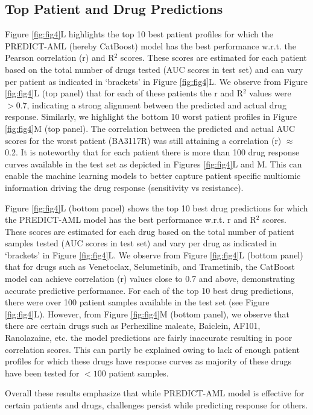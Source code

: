\documentclass[pdflatex,sn-mathphys-num]{sn-jnl}%
\theoremstyle{thmstyleone}%
\theoremstyle{thmstyletwo}%
\theoremstyle{thmstylethree}%
\begin{document}
\subsection{Top Patient and Drug Predictions}
Figure \ref{fig:fig4}L highlights the top 10 best patient profiles for which the PREDICT-AML (hereby CatBoost) model has the best performance w.r.t. the Pearson correlation (r) and R$^2$ scores. These scores are estimated for each patient based on the total number of drugs tested (AUC scores in test set) and can vary per patient as indicated in `brackets' in Figure \ref{fig:fig4}L. We observe from Figure \ref{fig:fig4}L (top panel) that for each of these patients the r and R$^2$ values were $> 0.7$, indicating a strong alignment between the predicted and actual drug response. Similarly, we highlight the bottom 10 worst patient profiles in Figure \ref{fig:fig4}M (top panel). The correlation between the predicted and actual AUC scores for the worst patient (BA3117R) was still attaining a correlation (r) $\approx$ 0.2. It is noteworthy that for each patient there is more than 100 drug response curves available in the test set as depicted in Figures \ref{fig:fig4}L and M. This can enable the machine learning models to better capture patient specific multiomic information driving the drug response (sensitivity vs resistance).

Figure \ref{fig:fig4}L (bottom panel) shows the top 10 best drug predictions for which the PREDICT-AML model has the best performance w.r.t. r and R$^2$ scores. These scores are estimated for each drug based on the total number of patient samples tested (AUC scores in test set) and vary per drug as indicated in `brackets' in Figure \ref{fig:fig4}L. We observe from Figure \ref{fig:fig4}L (bottom panel) that for drugs such as Venetoclax, Selumetinib, and Trametinib, the CatBoost model can achieve correlation (r) values close to 0.7 and above, demonstrating accurate predictive performance. For each of the top 10 best drug predictions, there were over 100 patient samples available in the test set (see Figure \ref{fig:fig4}L). However, from Figure \ref{fig:fig4}M (bottom panel), we observe that there are certain drugs such as Perhexiline maleate, Baiclein, AF101, Ranolazaine, etc. the model predictions are fairly inaccurate resulting in poor correlation scores. This can partly be explained owing to lack of enough patient profiles for which these drugs have response curves as majority of these drugs have been tested for $< 100$ patient samples. 

Overall these results emphasize that while PREDICT-AML model is effective for certain patients and drugs, challenges persist while predicting response for others. 
\end{document}
